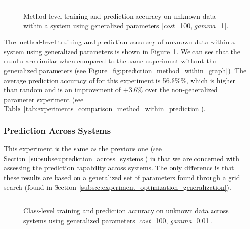 \begin{figure}[!tb]
  \centering
  \begin{adjustbox}{max size={\textwidth}{\textheight}}
    
  \end{adjustbox}
  \caption{Method-level training and prediction accuracy on unknown data within a system using generalized parameters [\emph{cost}=100, \emph{gamma}=1].}
  \vspace{2mm}
  \hrule
  \label{fig:prediction_with_parameters_method_within_graph}
\end{figure}

The method-level training and prediction accuracy of unknown data within a system using generalized parameters is shown in Figure~\ref{fig:prediction_with_parameters_method_within_graph}. We can see that the results are similar when compared to the same experiment without the generalized parameters (see Figure~\ref{fig:prediction_method_within_graph}). The average prediction accuracy of for this experiment is 56.8\%\%, which is higher than random and is an improvement of +3.6\% over the non-generalized parameter experiment (see Table~\ref{tab:experiments_comparison_method_within_prediction}).

\subsubsection{Prediction Across Systems}
\label{subsubsec:prediction_with_parameters_across_systems}
This experiment is the same as the previous one (see Section~\ref{subsubsec:prediction_across_systems}) in that we are concerned with assessing the prediction capability across systems. The only difference is that these results are based on a generalized set of parameters found through a grid search (found in Section~\ref{subsec:experiment_optimization_generalization}).

\begin{figure}[!tb]
  \centering
  \begin{adjustbox}{max size={\textwidth}{\textheight}}
    
  \end{adjustbox}
  \caption{Class-level training and prediction accuracy on unknown data across systems using generalized parameters [\emph{cost}=100, \emph{gamma}=0.01].}
  \vspace{2mm}
  \hrule
  \label{fig:prediction_with_parameters_class_across_graph}
\end{figure}

